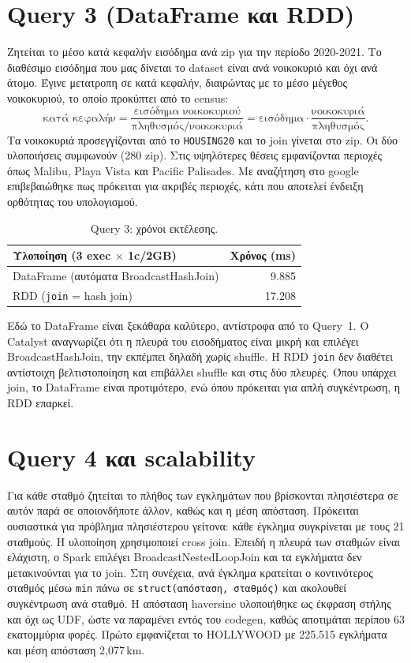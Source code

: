 \documentclass[11pt]{article}
\newcommand{\code}[1]{\texttt{\small #1}}
\newcommand{\en}[1]{\textenglish{#1}}
\begin{document}
\section{Query 3 (DataFrame και RDD)}

Ζητείται το μέσο κατά κεφαλήν εισόδημα ανά \en{zip} για την περίοδο 2020-2021. Το
διαθέσιμο εισόδημα που μας δίνεται το dataset είναι ανά νοικοκυριό και όχι ανά άτομο. Έγινε μετατροπη σε κατά
κεφαλήν, διαιρώντας με το μέσο μέγεθος νοικοκυριού, το οποίο προκύπτει από το
\en{census}:
\[
\text{κατά κεφαλήν} = \frac{\text{εισόδημα νοικοκυριού}}{\text{πληθυσμός}/\text{νοικοκυριά}}
= \text{εισόδημα} \cdot \frac{\text{νοικοκυριά}}{\text{πληθυσμός}}.
\]
Τα νοικοκυριά προσεγγίζονται από το \code{HOUSING20} και το \en{join} γίνεται στο
\en{zip}. Οι δύο υλοποιήσεις συμφωνούν (280 \en{zip}). Στις υψηλότερες θέσεις
εμφανίζονται περιοχές όπως Malibu, Playa Vista και Pacific Palisades. Με αναζήτηση στο google επιβεβαιώθηκε πως πρόκειται για ακριβές
περιοχές, κάτι που αποτελεί ένδειξη ορθότητας του υπολογισμού.

\begin{table}[h]\centering
\begin{tabular}{lr}
\toprule
Υλοποίηση (3 \en{exec} $\times$ 1\en{c}/2\en{GB}) & Χρόνος (ms) \\
\midrule
\en{DataFrame} (αυτόματα \en{BroadcastHashJoin}) & 9.885 \\
\en{RDD} (\code{join} = \en{hash join}) & 17.208 \\
\bottomrule
\end{tabular}
\caption{Query 3: χρόνοι εκτέλεσης.}
\label{tab:q3time}
\end{table}

Εδώ το \en{DataFrame} είναι ξεκάθαρα καλύτερο, αντίστροφα από το \en{Query}~1. Ο
\en{Catalyst} αναγνωρίζει ότι η πλευρά του εισοδήματος είναι μικρή και επιλέγει
\en{BroadcastHashJoin}, την εκπέμπει δηλαδή χωρίς \en{shuffle}. Η \en{RDD}
\code{join} δεν διαθέτει αντίστοιχη βελτιστοποίηση και επιβάλλει \en{shuffle} και
στις δύο πλευρές. Όπου υπάρχει \en{join}, το \en{DataFrame} είναι προτιμότερο, ενώ όπου
πρόκειται για απλή συγκέντρωση, η \en{RDD} επαρκεί.

\section{Query 4 και scalability}

Για κάθε σταθμό ζητείται το πλήθος των εγκλημάτων που βρίσκονται πλησιέστερα σε
αυτόν παρά σε οποιονδήποτε άλλον, καθώς και η μέση απόσταση. Πρόκειται ουσιαστικά
για πρόβλημα πλησιέστερου γείτονα: κάθε έγκλημα συγκρίνεται με τους 21 σταθμούς. Η
υλοποίηση χρησιμοποιεί \en{cross join}. Επειδή η πλευρά των σταθμών είναι ελάχιστη,
ο \en{Spark} επιλέγει \en{BroadcastNestedLoopJoin} και τα εγκλήματα δεν μετακινούνται
για το \en{join}. Στη συνέχεια, ανά έγκλημα κρατείται ο κοντινότερος σταθμός μέσω
\code{min} πάνω σε \code{struct(απόσταση, σταθμός)} και ακολουθεί συγκέντρωση ανά
σταθμό. Η απόσταση \en{haversine} υλοποιήθηκε ως έκφραση στήλης και όχι ως \en{UDF},
ώστε να παραμένει εντός του \en{codegen}, καθώς αποτιμάται περίπου 63 εκατομμύρια
φορές. Πρώτο εμφανίζεται το \en{HOLLYWOOD} με 225.515 εγκλήματα και μέση απόσταση
2,077\,km.
\end{document}
